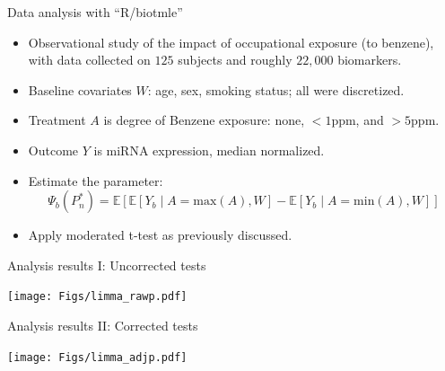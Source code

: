 \documentclass[12pt,t,handout]{beamer}
\begin{document}
\begin{frame}[c]{Data analysis with ``R/biotmle''}

\begin{center}
\begin{itemize}
  \itemsep12pt
  \item Observational study of the impact of occupational exposure (to benzene),
    with data collected on $125$ subjects and roughly $22,000$ biomarkers.
  \item Baseline covariates $W$: age, sex, smoking status; all were discretized.
  \item Treatment $A$ is degree of Benzene exposure: none, $<1$ppm, and $>5$ppm.
  \item Outcome $Y$ is miRNA expression, median normalized.
  \item Estimate the parameter:
    \[
      \Psi_b(P_n^*) = \mathbb{E}[\mathbb{E}[Y_b \mid A = \text{max}(A), W] -
      \mathbb{E}[Y_b \mid A = \text{min}(A), W]]
    \]
  \item Apply moderated t-test as previously discussed.
\end{itemize}
\end{center}

\end{frame}



\begin{frame}[c]{Analysis results I: Uncorrected tests}

\begin{center}
  \texttt{[image: Figs/limma\_rawp.pdf]}
\end{center}

\end{frame}



\begin{frame}[c]{Analysis results II: Corrected tests}

\begin{center}
  \texttt{[image: Figs/limma\_adjp.pdf]}
\end{center}

\end{frame}
\end{document}
